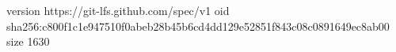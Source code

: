 version https://git-lfs.github.com/spec/v1
oid sha256:c800f1c1e947510f0abeb28b45b6cd4dd129e52851f843c08c0891649ec8ab00
size 1630
